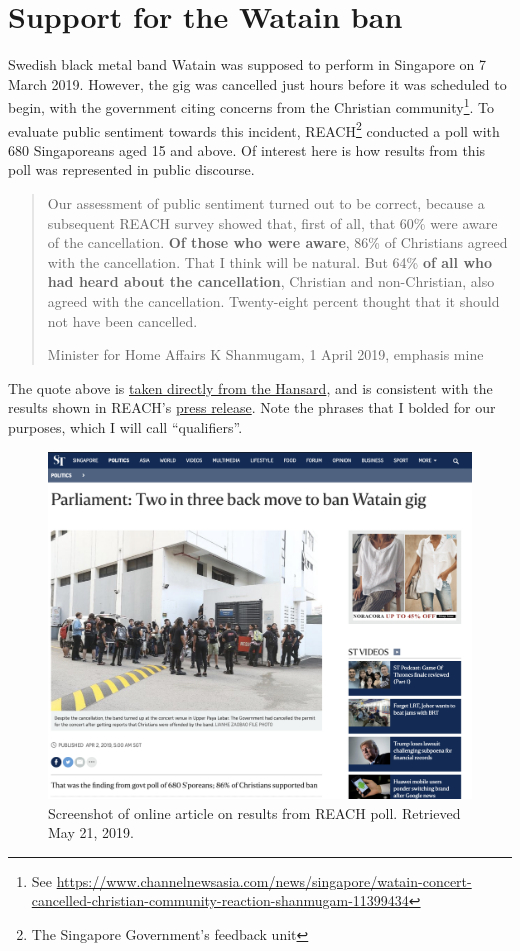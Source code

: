 \documentclass[
  openany]{book}
\begin{document}
\hypertarget{watain}{%
\section{Support for the Watain ban}\label{watain}}

Swedish black metal band Watain was supposed to perform in Singapore on 7 March 2019. However, the gig was cancelled just hours before it was scheduled to begin, with the government citing concerns from the Christian community\footnote{See \url{https://www.channelnewsasia.com/news/singapore/watain-concert-cancelled-christian-community-reaction-shanmugam-11399434}}. To evaluate public sentiment towards this incident, REACH\footnote{The Singapore Government's feedback unit} conducted a poll with 680 Singaporeans aged 15 and above. Of interest here is how results from this poll was represented in public discourse.

\begin{quote}
Our assessment of public sentiment turned out to be correct, because a subsequent REACH survey showed that, first of all, that 60\% were aware of the cancellation. \textbf{Of those who were aware}, 86\% of Christians agreed with the cancellation. That I think will be natural. But 64\% \textbf{of all who had heard about the cancellation}, Christian and non-Christian, also agreed with the cancellation. Twenty-eight percent thought that it should not have been cancelled.

Minister for Home Affairs K Shanmugam, 1 April 2019, emphasis mine
\end{quote}

The quote above is \href{https://sprs.parl.gov.sg/search/sprs3topic?reportid=ministerial-statement-1170}{taken directly from the Hansard}, and is consistent with the results shown in REACH's \href{https://www.reach.gov.sg/~/media/2019/press-release/findings-of-poll-on-watain-concert--1-april-2019.pdf}{press release}. Note the phrases that I bolded for our purposes, which I will call ``qualifiers''.

\begin{figure}

{\centering \includegraphics[width=0.8\linewidth]{images/proportion/STwatain} 

}

\caption{Screenshot of online article on results from REACH poll. Retrieved May 21, 2019.}\label{fig:st-watain}
\end{figure}
\end{document}
